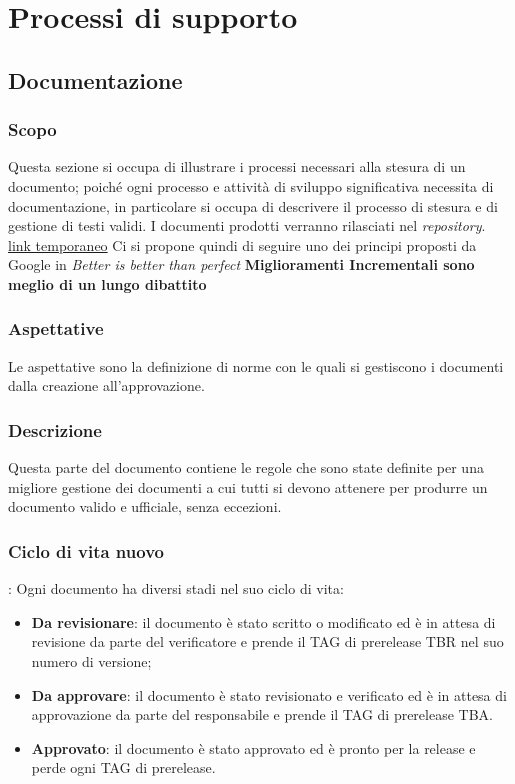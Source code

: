 \section{Processi di supporto}
  \subsection{Documentazione}

  \subsubsection{Scopo}
  Questa sezione si occupa di illustrare i processi necessari alla stesura di un
  documento; poiché ogni processo e attivit\`a di sviluppo significativa necessita
  di documentazione, in particolare si occupa di descrivere il processo di stesura e
  di gestione di testi validi.
  I documenti prodotti verranno rilasciati nel \textit{repository}\glo.
  \href{https://GitHub.com/Jatus93/sweDocs}{link temporaneo}
  Ci si propone quindi di seguire uno dei principi proposti da Google in
  \textit{Better is better than perfect}
  \textbf{Miglioramenti Incrementali sono meglio di un lungo dibattito}

  \subsubsection{Aspettative}
  Le aspettative sono la definizione di norme con le quali
  si gestiscono i documenti dalla creazione all'approvazione.

  \subsubsection{Descrizione}
  Questa parte del documento contiene le regole che sono state definite per una
  migliore gestione dei documenti a cui tutti si devono attenere per produrre un
  documento valido e ufficiale, senza eccezioni.

  \subsubsection{Ciclo di vita nuovo}:
  Ogni documento ha diversi stadi nel suo ciclo di vita:
  \begin{itemize}
    \item \textbf{Da revisionare}: il documento è stato scritto o modificato ed è
    in attesa di revisione da parte del verificatore e prende il TAG di prerelease
     TBR nel suo numero di versione;
    \item \textbf{Da approvare}: il documento è stato revisionato e verificato ed
    è in attesa di approvazione da parte del responsabile e prende il TAG di prerelease
    TBA.
    \item \textbf{Approvato}: il documento è stato approvato ed è pronto per la release
    e perde ogni TAG di prerelease.
  \end{itemize}

